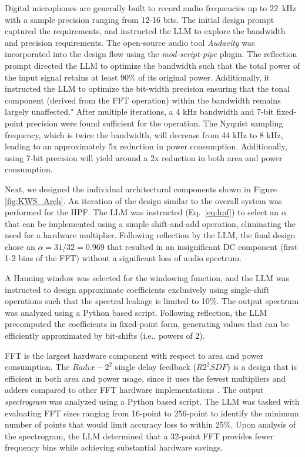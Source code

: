 Digital microphones are generally built to record audio frequencies up to 22~kHz with a sample precision ranging from 12-16 bits. The initial design prompt captured the requirements, and instructed the LLM to explore the bandwidth and precision requirements. The open-source audio tool \textit{Audacity} was incorporated into the design flow using the \textit{ mod-script-pipe} plugin. The reflection prompt directed the LLM to optimize the bandwidth such that the total power of the input signal retains at least 90\% of its original power. Additionally, it instructed the LLM to optimize the bit-width precision ensuring that the tonal component (derived from the FFT operation) within the bandwidth remains largely unaffected."
 After multiple iterations, a 4 kHz bandwidth and 7-bit fixed-point precision were found sufficient for the operation. The Nyquist sampling frequency, which is twice the bandwidth, will decrease from 44 kHz to 8 kHz, leading to an approximately 5x reduction in power consumption. Additionally, using 7-bit precision will yield around a 2x reduction in both area and power consumption.

Next, we designed the individual architectural components shown in Figure \ref{fig:KWS_Arch}. An iteration of the design similar to the overall system was performed for the HPF. The LLM was instructed (Eq.~\ref{eq:hpf}) to select an $\alpha$ that can be implemented using a simple shift-and-add operation, eliminating the need for a hardware multiplier. Following reflection by the LLM, the final design chose an $\alpha = 31/32 = 0.969$ that resulted in an insignificant DC component (first 1-2 bins of the FFT) without a significant loss of audio spectrum. 

A Hanning window was selected for the windowing function, and the LLM was instructed to design approximate coefficients exclusively using single-shift operations such that the spectral leakage is limited to 10\%. The output spectrum was analyzed using a Python based script. Following reflection, the LLM precomputed the coefficients in fixed-point form, generating values that can be efficiently approximated by bit-shifts (i.e., powers of 2).

FFT is the largest hardware component with respect to area and power consumption. The $Radix-2^2$ single delay feedback ($R2^2SDF$) is a design that is efficient in both area and power usage, since it uses the fewest multipliers and adders compared to other FFT hardware implementations \cite{chong20220}. The output \textit{spectrogram} was analyzed using a Python based script. The LLM was tasked with evaluating FFT sizes ranging from 16-point to 256-point to identify the minimum number of points that would limit accuracy loss to within 25\%. Upon analysis of the spectrogram, the LLM determined that a 32-point FFT provides fewer frequency bins while achieving substantial hardware savings.

